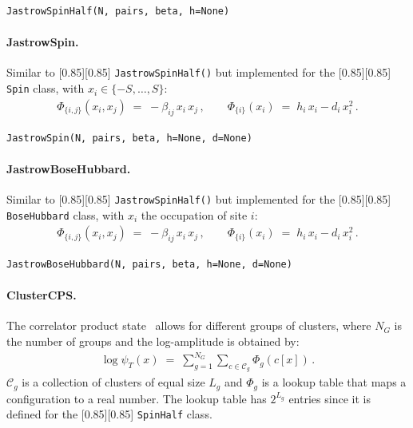 \documentclass{SciPost}
\newcommand{\pyinline}[1]{\begingroup\setlength{\fboxsep}{0pt}%
  \colorbox{gray!15}{\raisebox{0pt}[0.85\ht\strutbox][0.85\dp\strutbox]{%
    \hspace{1pt}\lstinline{#1}\hspace{1pt}}}\endgroup}
\begin{document}
\begin{lstlisting}
JastrowSpinHalf(N, pairs, beta, h=None)
\end{lstlisting}

\paragraph{JastrowSpin.}
Similar to \pyinline{JastrowSpinHalf()} but implemented for the \pyinline{Spin} class, with $x_i \in \{-S,\dots,S\}$:
\begin{align}
	\Phi_{\{i,j\}}(x_i, x_j) \;=\; -\beta_{ij}\, x_i\, x_j\,,
	\qquad
	\Phi_{\{i\}}(x_i) \;=\; h_i\, x_i - d_i\, x_i^2\,.
	\label{eq:phi_jastrowspin}
\end{align}
\begin{lstlisting}
JastrowSpin(N, pairs, beta, h=None, d=None)
\end{lstlisting}

\paragraph{JastrowBoseHubbard.}
Similar to \pyinline{JastrowSpinHalf()} but implemented for the \pyinline{BoseHubbard} class, with $x_i$ the occupation of site $i$:
\begin{align}
	\Phi_{\{i,j\}}(x_i, x_j) \;=\; -\beta_{ij}\, x_i\, x_j\,,
	\qquad
	\Phi_{\{i\}}(x_i) \;=\; h_i\, x_i - d_i\, x_i^2\,.
	\label{eq:phi_jastrowbosehubbard}
\end{align}
\begin{lstlisting}
JastrowBoseHubbard(N, pairs, beta, h=None, d=None)
\end{lstlisting}
\paragraph{ClusterCPS.}
The correlator product state~\cite{changlani_approximating_2009,mezzacapo_ground-state_2009} allows for different groups of clusters, where $N_G$ is the number of groups and the log-amplitude is obtained by:
\begin{align}
	\log\psi_T(x) \;=\; \sum_{g=1}^{N_G} \sum_{c\in\mathcal{C}_g} \Phi_g(c[x])\,.
	\label{eq:phi_clustercps}
\end{align}
$\mathcal{C}_g$ is a collection of clusters of equal size $L_g$ and $\Phi_g$ is a lookup table that maps a configuration to a real number.
%
The lookup table has $2^{L_g}$ entries since it is defined for the \pyinline{SpinHalf} class.
\end{document}
